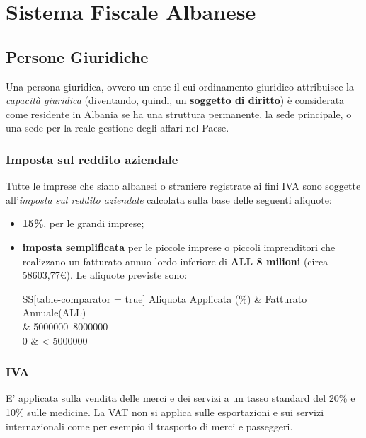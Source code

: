 \chapter[Sistema Fiscale Albanese]{Sistema Fiscale Albanese}
  \label{sec:normative_fiscali_albania}

\section[Persone Giuridiche]{Persone Giuridiche}
Una persona giuridica, ovvero un ente il cui ordinamento giuridico attribuisce la \textit{capacità giuridica} (diventando, quindi, un \textbf{soggetto di diritto}) è considerata come residente in Albania se ha una struttura permanente, la sede principale, o una sede per la reale gestione degli affari nel Paese.
\subsection{Imposta sul reddito aziendale} 
Tutte le imprese che siano albanesi o straniere registrate ai fini \ac{IVA} sono soggette all'\textit{imposta sul reddito aziendale} calcolata sulla base delle seguenti aliquote:
\begin{itemize}
	\item \textbf{15\%}, per le grandi imprese;
	\item \textbf{imposta semplificata} per le piccole imprese o piccoli imprenditori che realizzano un fatturato annuo lordo inferiore di \textbf{ALL 8 milioni} (circa 58603,77\euro). Le aliquote previste sono:
		\begin{center}
 			\begin{tabular}{SS[table-comparator = true]}
 			\toprule 
 				{Aliquota Applicata (\%)} & {Fatturato Annuale(ALL)} \\
 			 & \numrange{5000000}{8000000} \\
 				0 & < 5000000 \\
 			\bottomrule
 			\end{tabular} 
		\end{center}
\end{itemize} 
\subsection{IVA}
E' applicata sulla vendita delle merci e dei servizi a un tasso standard del 20\% e 10\% sulle medicine. La VAT non si applica sulle
esportazioni e sui servizi internazionali come per esempio il trasporto di merci e passeggeri.
